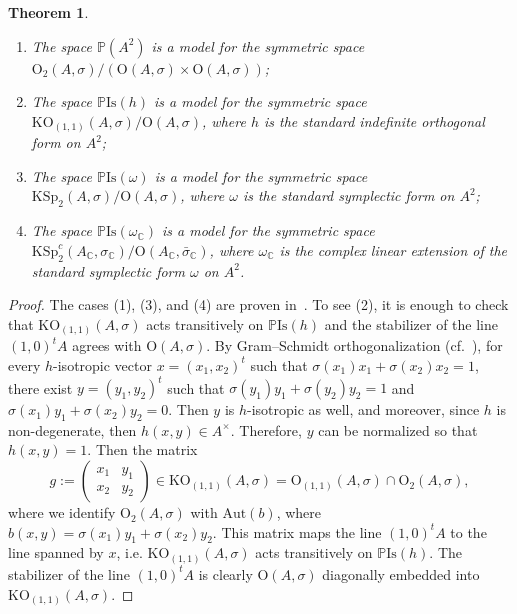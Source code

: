 \documentclass[oneside,11pt]{amsart}
\newtheorem{thm}{Theorem}[section]
\theoremstyle{definition}
\theoremstyle{remark}
\numberwithin{thm}{section}
\numberwithin{equation}{section}
\begin{document}
\begin{thm}$ $
    \begin{enumerate}
        \item The space $\mathbb P(A^2)$ is a model for the symmetric space  
        $\mathrm{O}_2(A,\sigma)/(\mathrm{O}(A,\sigma)\times\mathrm{O}(A,\sigma))$;
        \item The space $\mathbb P\mathrm{Is}(h)$ is a model for the symmetric space $\mathrm{KO}_{(1,1)}(A,\sigma)/\mathrm{O}(A,\sigma)$, where $h$ is the standard indefinite orthogonal form on $A^2$;
        \item The space $\mathbb P\mathrm{Is}(\omega)$ is a model for the symmetric space $\mathrm{KSp}_2(A,\sigma)/\mathrm{O}(A,\sigma)$, where $\omega$ is the standard symplectic form on $A^2$;
        \item The space $\mathbb P\mathrm{Is}(\omega_\mathbb C)$ is a model for the symmetric space $\mathrm{KSp}^c_2(A_\mathbb C,\sigma_\mathbb C)/\mathrm{O}(A_\mathbb C,\bar\sigma_\mathbb C)$, where $\omega_\mathbb C$ is the complex linear extension of the standard symplectic form $\omega$ on $A^2$.
    \end{enumerate}    
\end{thm}

\begin{proof}
    The cases (1), (3), and (4) are proven in~\cite[Corollary 4.2 and 4.3]{ABRRW}. To see (2), it is enough to check that $\mathrm{KO}_{(1,1)}(A,\sigma)$ acts transitively on $\mathbb P\mathrm{Is}(h)$ and the stabilizer of the line $(1,0)^tA$ agrees with $\mathrm{O}(A,\sigma)$. By Gram--Schmidt orthogonalization (cf.~\cite[Proposition~3.16]{ABRRW}), for every $h$-isotropic vector $x=(x_1,x_2)^t$ such that $\sigma(x_1)x_1+\sigma(x_2)x_2=1$, there exist $y=(y_1,y_2)^t$ such that $\sigma(y_1)y_1+\sigma(y_2)y_2=1$ and $\sigma(x_1)y_1+\sigma(x_2)y_2=0$. Then $y$ is $h$-isotropic as well, and moreover, since $h$ is non-degenerate, then $h(x,y)\in A^\times$. Therefore, $y$ can be normalized so that $h(x,y)=1$. Then the matrix 
    \[g:=\begin{pmatrix}
        x_1 & y_1 \\
        x_2 & y_2
        \end{pmatrix}\in \mathrm{KO}_{(1,1)}(A,\sigma)=\mathrm{O}_{(1,1)}(A,\sigma)\cap \mathrm{O}_{2}(A,\sigma),\] 
    where we identify  $\mathrm{O}_{2}(A,\sigma)$ with $\mathrm{Aut}(b)$, where $b(x,y)=\sigma(x_1)y_1+\sigma(x_2)y_2$. This matrix maps the line $(1,0)^tA$ to the line spanned by $x$, i.e. $\mathrm{KO}_{(1,1)}(A,\sigma)$ acts transitively on $\mathbb P\mathrm{Is}(h)$. The stabilizer of the line $(1,0)^tA$ is clearly $\mathrm{O}(A,\sigma)$ diagonally embedded into $\mathrm{KO}_{(1,1)}(A,\sigma)$.  
\end{proof}
\end{document}
